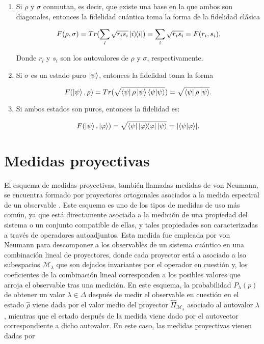 \begin{enumerate}
    \item Si $\rho$ y $\sigma$ conmutan, es decir, que existe una base en la que ambos son diagonales, entonces la fidelidad cuántica toma la forma de la fidelidad clásica

        \begin{equation}
            F(\rho, \sigma) = Tr(\sum\limits_i \sqrt{r_i s_i} \ketbra{i}{i}) = \sum\limits_i \sqrt{r_i s_i} = F(r_i, s_i) ,
        \end{equation}

        Donde $r_i$ y $s_i$ son los autovalores de $\rho$ y $\sigma$, respectivamente.

    \item Si $\sigma$ es un estado puro $\ket{\psi}$, entonces la fidelidad toma la forma

        \begin{equation}
            F(\ket{\psi}, \rho) = Tr(\sqrt{\bra{\psi} \rho \ket{\psi} \braket{\psi}{\psi}}) = \sqrt{\bra{\psi} \rho \ket{\psi}} .
        \end{equation}

    \item Si ambos estados son puros, entonces la fidelidad es:

        \begin{equation}
            F(\ket{\psi}, \ket{\varphi}) = \sqrt{\bra{\psi} \ketbra{\varphi}{\varphi} \ket{\psi}} = \abs{\braket{\psi}{\varphi}} .
        \end{equation}
\end{enumerate}

\section{Medidas proyectivas}

El esquema de medidas proyectivas, también llamadas medidas de von Neumann, se encuentra formado por proyectores ortogonales asociados a la medida espectral de un observable \cite{sttiwuer}. Este esquema es uno de los tipos de medidas de uso más común, ya que está directamente asociada a la medición de una propiedad del sistema o un conjunto compatible de ellas, y tales propiedades son caracterizadas a través de operadores autoadjuntos. Esta medida fue empleada por von Neumann para descomponer a los observables de un sistema cuántico en una combinación lineal de proyectores, donde cada proyector está a asociado a lso subespacios $\mathcal{M}_\lambda$ que son dejados invariantes por el operador en cuestión y, los coeficientes de la combinación lineal corresponden a los posibles valores que arroja el observable tras una medición. En este esquema, la probabilidad $P_\lambda(p)$ de obtener un valor $\lambda \in \Delta$ después de medir el observable en cuestión en el estado $\hat{\rho}$ viene dada por el valor medio del proyector $\hat{\Pi}_{\mathcal{M}_\lambda}$ asociado al autovalor $\lambda$, mientras que el estado después de la medida viene dado por el autovector correspondiente a dicho autovalor. En este caso, las medidas proyectivas vienen dadas por

